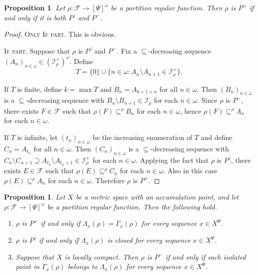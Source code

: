 \documentclass{amsart}
\theoremstyle{plain}
\newtheorem{prop}[thm]{Proposition}
\theoremstyle{definition}
\theoremstyle{remark}
\newcommand{\cF}{\mathcal{F}}
\newcommand{\cI}{\mathcal{I}}
\newcommand{\I}{\cI}
\begin{document}
\begin{prop}
\label{P-like_basic}
Let $\rho: \mathcal{F}\to [\Psi]^\omega$ be a partition regular function. Then $\rho$ is $P^+$ if and only if it is both $P^{\,|}$ and $P^-$.
\end{prop}

\begin{proof}
\textsc{Only If part.} This is obvious. 


\textsc{If part.} 
Suppose that $\rho$ is $P^{\,|}$ and $P^-$. Fix a $\subseteq$-decreasing sequence $(A_n)_{n\in\omega}\in (\I_{\rho}^+)^\omega$. Define 
\begin{equation*}
T=\{0\}\cup \{n\in\omega: A_n\setminus A_{n+1}\in \I_{\rho}^+\}.
\end{equation*}

If $T$ is finite, define $k=\max T$ and $B_n=A_{k+1+n}$ for all $n\in\omega$. Then $(B_n)_{n\in\omega}$ is a $\subseteq$-decreasing sequence with $B_n\setminus B_{n+1}\in \I_{\rho}$ for each $n\in\omega$. Since $\rho$ is $P^-$,
there exists $F\in\cF$ such that $\rho(F)\subseteq^\rho B_n$
for each $n\in\omega$, hence $\rho(F)\subseteq^\rho A_n$ for each $n\in\omega$.

If $T$ is infinite, let $(t_n)_{n\in\omega}$ be the increasing enumeration of $T$ and define $C_n=A_{t_n}$ for all $n\in\omega$. Then $(C_n)_{n\in\omega}$ is a $\subseteq$-decreasing sequence with $C_n\setminus C_{n+1}\supseteq A_{t_n}\setminus A_{t_n+1}\in \I^+_{\rho}$ for each $n\in\omega$. Applying the fact that $\rho$ is $P^{\,|}$, there exists $E\in\cF$ such that $\rho(E)\subseteq^\rho C_n$
for each $n\in\omega$. Also in this case $\rho(E)\subseteq^\rho A_n$ for each $n\in\omega$. Therefore $\rho$ is $P^+$.
\end{proof}


\begin{prop}
\label{P-like_for_spaces}
Let $X$ be a metric space with an accumulation point, and let  $\rho: \mathcal{F}\to [\Psi]^\omega$ be a partition regular function. Then the following hold.
\begin{enumerate}[label={\rm (\roman{*})}]
    \item $\rho$ is $P^+$ if and only if $\Lambda_x(\rho)=\Gamma_x(\rho)$ for every sequence $x\in X^\Psi$.\label{P-like_for_spaces:+}
    
    \item $\rho$ is $P^{\,|}$ if and only if $\Lambda_x(\rho)$ is closed for every sequence $x\in X^\Psi$.\label{P-like_for_spaces:|}
    
    \item Suppose that $X$ is locally compact. Then $\rho$ is $P^-$ if and only if each isolated point in $\Gamma_x(\rho)$ belongs to $\Lambda_x(\rho)$ for every sequence $x\in X^\Psi$.\label{P-like_for_spaces:-}
\end{enumerate}
\end{prop}
\end{document}
